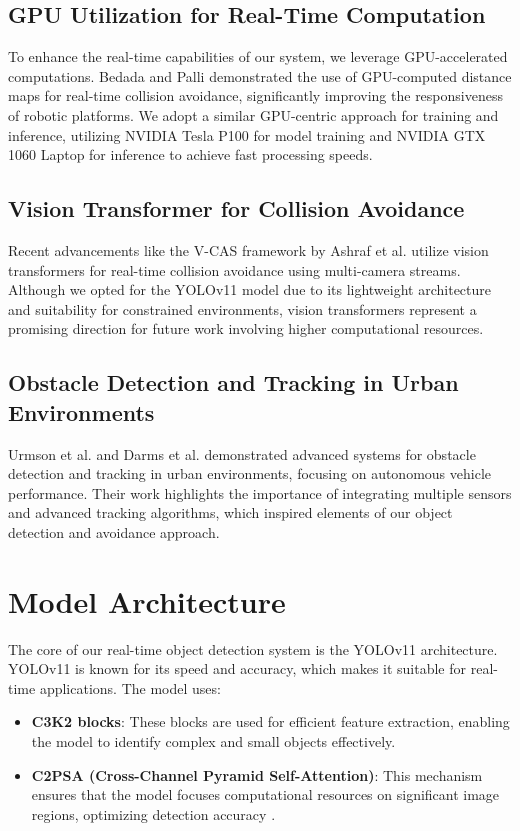 \documentclass[12pt]{article}
\begin{document}
\subsection{GPU Utilization for Real-Time Computation}
To enhance the real-time capabilities of our system, we leverage GPU-accelerated computations. Bedada and Palli \cite{bedada2024real} demonstrated the use of GPU-computed distance maps for real-time collision avoidance, significantly improving the responsiveness of robotic platforms. We adopt a similar GPU-centric approach for training and inference, utilizing NVIDIA Tesla P100 for model training and NVIDIA GTX 1060 Laptop for inference to achieve fast processing speeds.

\subsection{Vision Transformer for Collision Avoidance}
Recent advancements like the V-CAS framework by Ashraf et al. \cite{ashraf2024v} utilize vision transformers for real-time collision avoidance using multi-camera streams. Although we opted for the YOLOv11 model due to its lightweight architecture and suitability for constrained environments, vision transformers represent a promising direction for future work involving higher computational resources.

\subsection{Obstacle Detection and Tracking in Urban Environments}
Urmson et al. \cite{urmson2008autonomous} and Darms et al. \cite{darms2008obstacle} demonstrated advanced systems for obstacle detection and tracking in urban environments, focusing on autonomous vehicle performance. Their work highlights the importance of integrating multiple sensors and advanced tracking algorithms, which inspired elements of our object detection and avoidance approach.

\section{Model Architecture}

The core of our real-time object detection system is the YOLOv11 architecture. YOLOv11 is known for its speed and accuracy, which makes it suitable for real-time applications. The model uses:

\begin{itemize}
    \item 	\textbf{C3K2 blocks}: These blocks are used for efficient feature extraction, enabling the model to identify complex and small objects effectively.
    \item 	\textbf{C2PSA (Cross-Channel Pyramid Self-Attention)}: This mechanism ensures that the model focuses computational resources on significant image regions, optimizing detection accuracy \cite{ashraf2024v}.
\end{itemize}
\end{document}
